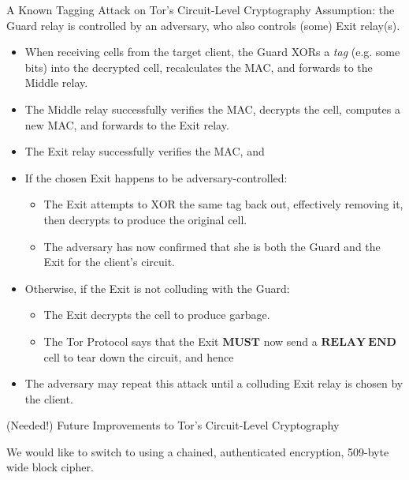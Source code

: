 \documentclass[9pt,a4paper,handout]{beamer}
\begin{document}
\begin{frame}{A Known Tagging Attack on Tor's Circuit-Level Cryptography}
  Assumption: the Guard relay is controlled by an adversary, who also controls (some) Exit relay(s).

  \begin{itemize}
    \item<2-> When receiving cells from the target client, the Guard XORs a \emph{tag} (e.g. some
      bits) into the decrypted cell, recalculates the MAC, and forwards to the Middle relay.
    \item<3-> The Middle relay successfully verifies the MAC, decrypts the cell, computes a new
      MAC, and forwards to the Exit relay.
    \item<4-> The Exit relay successfully verifies the MAC, and
    \item<5-> If the chosen Exit happens to be adversary-controlled:
      \begin{itemize}
      \item<6-> The Exit attempts to XOR the same tag back out, effectively removing it, then
        decrypts to produce the original cell.
      \item<7-> The adversary has now confirmed that she is both the Guard and the Exit for the
        client's circuit.
      \end{itemize}
    \item<8-> Otherwise, if the Exit is not colluding with the Guard:
      \begin{itemize}
      \item<9-> The Exit decrypts the cell to produce garbage.
      \item<10-> The Tor Protocol says that the Exit $\mathbf{MUST}$ now send a
        $\mathbf{RELAY\:END}$ cell to tear down the circuit, and hence
      \end{itemize}
      \item<11-> The adversary may repeat this attack until a colluding Exit relay is chosen
        by the client.
    \end{itemize}
\end{frame}

\begin{frame}{(Needed!) Future Improvements to Tor's Circuit-Level Cryptography}

  We would like to switch to using a chained, authenticated encryption, 509-byte wide block cipher.


\end{frame}
\end{document}

